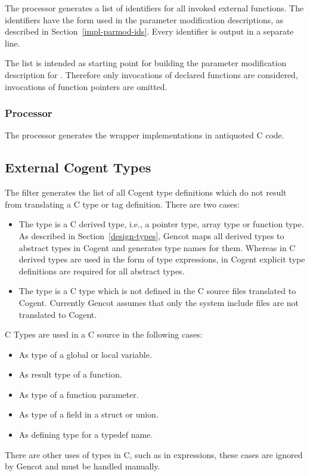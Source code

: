 The processor  generates a list of identifiers for all invoked external functions.
The identifiers have the form used in the parameter modification descriptions, as described in 
Section~\ref{impl-parmod-ids}. Every identifier is output in a separate line.

The list is intended as starting point for building the parameter modification description for .
Therefore only invocations of declared functions are considered, invocations of function pointers are omitted.

\subsubsection{Processor }

The processor  generates the wrapper implementations in antiquoted C code.

\subsection{External Cogent Types}
\label{impl-ccomps-exttypes}

The filter  generates the list of all Cogent type definitions which do not result from
translating a C type or tag definition. There are two cases:
\begin{itemize}
\item The type is a C derived type, i.e., a pointer type, array type or function type. As described in 
Section~\ref{design-types}, Gencot maps all derived types to abstract types in Cogent and generates type names for
them. Whereas in C derived types are used in the form of type expressions, in Cogent explicit type definitions are
required for all abstract types.
\item The type is a C type which is not defined in the C source files translated to Cogent. Currently Gencot assumes
that only the system include files are not translated to Cogent. 
\end{itemize}

C Types are used in a C source in the following cases:
\begin{itemize}
\item As type of a global or local variable.
\item As result type of a function.
\item As type of a function parameter.
\item As type of a field in a struct or union.
\item As defining type for a typedef name.
\end{itemize}
There are other uses of types in C, such as in  expressions, these cases are ignored by Gencot and 
must be handled manually.

